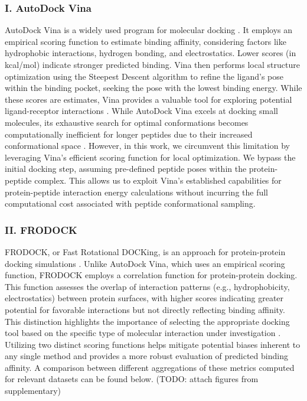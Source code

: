 \subsubsection*{I. AutoDock Vina}
AutoDock Vina is a widely used program for molecular docking \cite{trott2010autodock}. It employs an empirical scoring function to estimate binding affinity, considering factors like hydrophobic interactions, hydrogen bonding, and electrostatics. Lower scores (in kcal/mol) indicate stronger predicted binding. Vina then performs local structure optimization using the Steepest Descent algorithm to refine the ligand's pose within the binding pocket, seeking the pose with the lowest binding energy. While these scores are estimates, Vina provides a valuable tool for exploring potential ligand-receptor interactions \cite{trott2010autodock}. While AutoDock Vina excels at docking small molecules, its exhaustive search for optimal conformations becomes computationally inefficient for longer peptides due to their increased conformational space \cite{rentzsch2015docking}. However, in this work, we circumvent this limitation by leveraging Vina's efficient scoring function for local optimization. We bypass the initial docking step, assuming pre-defined peptide poses within the protein-peptide complex. This allows us to exploit Vina's established capabilities for protein-peptide interaction energy calculations without incurring the full computational cost associated with peptide conformational sampling.

\subsubsection*{II. FRODOCK}
FRODOCK, or Fast Rotational DOCKing, is an approach for protein-protein docking simulations \cite{Aportela2016}. Unlike AutoDock Vina, which uses an empirical scoring function, FRODOCK employs a correlation function for protein-protein docking. This function assesses the overlap of interaction patterns (e.g., hydrophobicity, electrostatics) between protein surfaces, with higher scores indicating greater potential for favorable interactions but not directly reflecting binding affinity. This distinction highlights the importance of selecting the appropriate docking tool based on the specific type of molecular interaction under investigation \cite{Aportela2016}.  \\

Utilizing two distinct scoring functions helps mitigate potential biases inherent to any single method and provides a more robust evaluation of predicted binding affinity. 
A comparison between different aggregations of these metrics computed for relevant datasets can be found below. (TODO: attach figures from supplementary)

